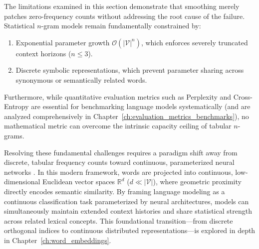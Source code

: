 \documentclass[../../main.tex]{subfiles}
\begin{document}
The limitations examined in this section demonstrate that smoothing merely patches zero-frequency counts without addressing the root cause of the failure. Statistical $n$-gram models remain fundamentally constrained by:
\begin{enumerate}
    \item Exponential parameter growth $\mathcal{O}(|\mathcal{V}|^n)$, which enforces severely truncated context horizons ($n \le 3$).
    \item Discrete symbolic representations, which prevent parameter sharing across synonymous or semantically related words.
\end{enumerate}

Furthermore, while quantitative evaluation metrics such as Perplexity and Cross-Entropy are essential for benchmarking language models systematically (and are analyzed comprehensively in Chapter~\ref{ch:evaluation_metrics_benchmarks}), no mathematical metric can overcome the intrinsic capacity ceiling of tabular $n$-grams.

Resolving these fundamental challenges requires a paradigm shift away from discrete, tabular frequency counts toward continuous, parameterized neural networks \citep{bengio2003}. In this modern framework, words are projected into continuous, low-dimensional Euclidean vector spaces $\mathbb{R}^d$ ($d \ll |\mathcal{V}|$), where geometric proximity directly encodes semantic similarity. By framing language modeling as a continuous classification task parameterized by neural architectures, models can simultaneously maintain extended context histories and share statistical strength across related lexical concepts. This foundational transition---from discrete orthogonal indices to continuous distributed representations---is explored in depth in Chapter~\ref{ch:word_embeddings}.

\clearpage\thispagestyle{empty}\null\clearpage
\end{document}
